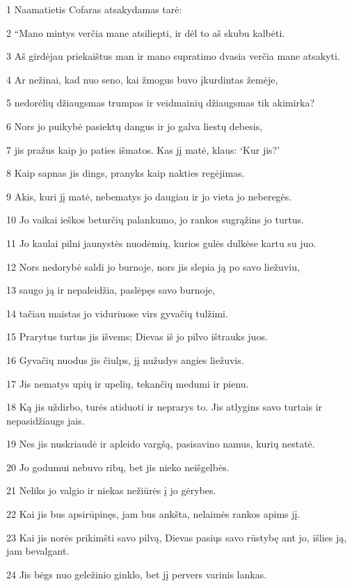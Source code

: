 \par 1 Naamatietis Cofaras atsakydamas tarė: 
\par 2 “Mano mintys verčia mane atsiliepti, ir dėl to aš skubu kalbėti. 
\par 3 Aš girdėjau priekaištus man ir mano supratimo dvasia verčia mane atsakyti. 
\par 4 Ar nežinai, kad nuo seno, kai žmogus buvo įkurdintas žemėje, 
\par 5 nedorėlių džiaugsmas trumpas ir veidmainių džiaugsmas tik akimirka? 
\par 6 Nors jo puikybė pasiektų dangus ir jo galva liestų debesis, 
\par 7 jis pražus kaip jo paties išmatos. Kas jį matė, klaus: ‘Kur jis?’ 
\par 8 Kaip sapnas jis dings, pranyks kaip nakties regėjimas. 
\par 9 Akis, kuri jį matė, nebematys jo daugiau ir jo vieta jo neberegės. 
\par 10 Jo vaikai ieškos beturčių palankumo, jo rankos sugrąžins jo turtus. 
\par 11 Jo kaulai pilni jaunystės nuodėmių, kurios gulės dulkėse kartu su juo. 
\par 12 Nors nedorybė saldi jo burnoje, nors jis slepia ją po savo liežuviu, 
\par 13 saugo ją ir nepaleidžia, paslėpęs savo burnoje, 
\par 14 tačiau maistas jo viduriuose virs gyvačių tulžimi. 
\par 15 Prarytus turtus jis išvems; Dievas iš jo pilvo ištrauks juos. 
\par 16 Gyvačių nuodus jis čiulps, jį nužudys angies liežuvis. 
\par 17 Jis nematys upių ir upelių, tekančių medumi ir pienu. 
\par 18 Ką jis uždirbo, turės atiduoti ir neprarys to. Jis atlygins savo turtais ir nepasidžiaugs jais. 
\par 19 Nes jis nuskriaudė ir apleido vargšą, pasisavino namus, kurių nestatė. 
\par 20 Jo godumui nebuvo ribų, bet jis nieko neišgelbės. 
\par 21 Neliks jo valgio ir niekas nežiūrės į jo gėrybes. 
\par 22 Kai jis bus apsirūpinęs, jam bus ankšta, nelaimės rankos apims jį. 
\par 23 Kai jis norės prikimšti savo pilvą, Dievas pasiųs savo rūstybę ant jo, išlies ją, jam bevalgant. 
\par 24 Jis bėgs nuo geležinio ginklo, bet jį pervers varinis lankas. 
